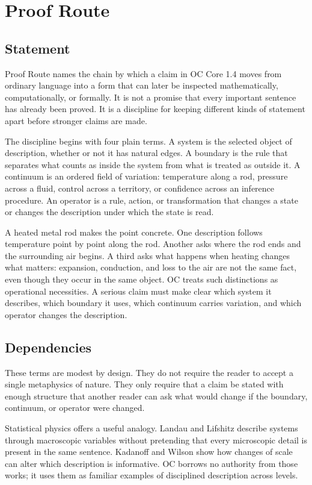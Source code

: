 \documentclass[11pt,a4paper,openany]{book}
\begin{document}
\section{Proof Route}
\subsection{Statement}
Proof Route names the chain by which a claim in OC Core 1.4 moves from ordinary language into a form that can later be inspected mathematically, computationally, or formally. It is not a promise that every important sentence has already been proved. It is a discipline for keeping different kinds of statement apart before stronger claims are made. \cite{goldenfeld_lectures,kadanoff_scaling}\par
The discipline begins with four plain terms. A system is the selected object of description, whether or not it has natural edges. A boundary is the rule that separates what counts as inside the system from what is treated as outside it. A continuum is an ordered field of variation: temperature along a rod, pressure across a fluid, control across a territory, or confidence across an inference procedure. An operator is a rule, action, or transformation that changes a state or changes the description under which the state is read.\par
A heated metal rod makes the point concrete. One description follows temperature point by point along the rod. Another asks where the rod ends and the surrounding air begins. A third asks what happens when heating changes what matters: expansion, conduction, and loss to the air are not the same fact, even though they occur in the same object. OC treats such distinctions as operational necessities. A serious claim must make clear which system it describes, which boundary it uses, which continuum carries variation, and which operator changes the description.\par
\subsection{Dependencies}
These terms are modest by design. They do not require the reader to accept a single metaphysics of nature. They only require that a claim be stated with enough structure that another reader can ask what would change if the boundary, continuum, or operator were changed. \cite{goldenfeld_lectures,kadanoff_scaling}\par
Statistical physics offers a useful analogy. Landau and Lifshitz describe systems through macroscopic variables without pretending that every microscopic detail is present in the same sentence. Kadanoff and Wilson show how changes of scale can alter which description is informative. OC borrows no authority from those works; it uses them as familiar examples of disciplined description across levels.\par
\end{document}
